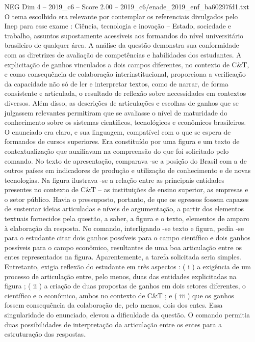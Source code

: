 \begin{textsample}{NEG Dim 4 – 2019\_c6 – Score 2.00 – 2019\_c6/enade\_2019\_enf\_ba60297fd1.txt}
O tema escolhido era relevante por contemplar os referenciais divulgados pelo Inep para esse exame : Ciência, tecnologia e inovação – Estado, sociedade e trabalho, assuntos supostamente acessíveis aos formandos do nível universitário brasileiro de qualquer área.
A análise da questão demonstra sua conformidade com as diretrizes de avaliação de competências e habilidades dos estudantes.
A explicitação de ganhos vinculados a dois campos diferentes, no contexto de C\&T, e como consequência de colaboração interinstitucional, proporciona a verificação da capacidade não só de ler e interpretar textos, como de narrar, de forma consistente e articulada, o resultado de reflexão sobre necessidades em contextos diversos.
Além disso, as descrições de articulações e escolhas de ganhos que se julgassem relevantes permitiram que se avaliasse o nível de maturidade do conhecimento sobre os sistemas científicos, tecnológicos e econômicos brasileiros.
O enunciado era claro, e sua linguagem, compatível com o que se espera de formandos de cursos superiores.
Era constituído por uma figura e um texto de contextualização que auxiliavam na compreensão do que foi solicitado pelo comando.
No texto de apresentação, comparava -se a posição do Brasil com a de outros países em indicadores de produção e utilização de conhecimento e de novas tecnologias.
Na figura ilustrava -se a relação entre as principais entidades presentes no contexto de C\&T – as instituições de ensino superior, as empresas e o setor público.
Havia o pressuposto, portanto, de que os egressos fossem capazes de sustentar ideias articuladas e níveis de argumentação, a partir dos elementos textuais fornecidos pela questão, a saber, a figura e o texto, elementos de amparo à elaboração da resposta.
No comando, interligando -se texto e figura, pedia -se para o estudante citar dois ganhos possíveis para o campo científico e dois ganhos possíveis para o campo econômico, resultantes de uma boa articulação entre os entes representados na figura.
Aparentemente, a tarefa solicitada seria simples.
Entretanto, exigia reflexão do estudante em três aspectos : ( i ) a exigência de um processo de articulação entre, pelo menos, duas das entidades explicitadas na figura ; ( ii ) a criação de duas propostas de ganhos em dois setores diferentes, o científico e o econômico, ambos no contexto de C\&T ; e ( iii ) que os ganhos fossem consequência da colaboração de, pelo menos, dois dos entes.
Essa singularidade do enunciado, elevou a dificuldade da questão.
O comando permitia duas possibilidades de interpretação da articulação entre os entes para a estruturação das respostas.

\end{textsample}
